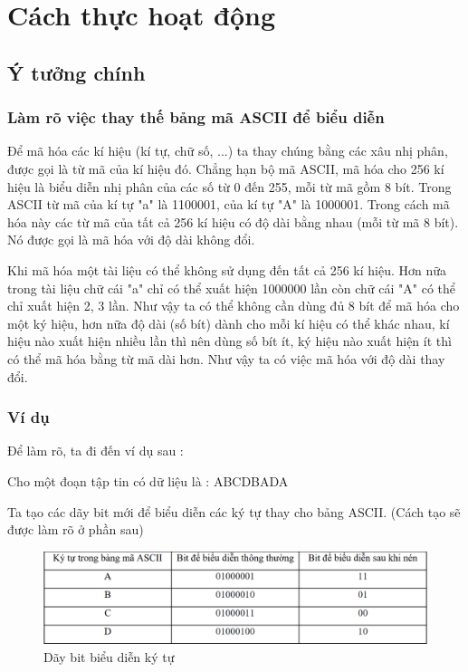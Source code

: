 \documentclass[14pt]{extreport}
\begin{document}
\chapter{Cách thực hoạt động}
\section{Ý tưởng chính}

\subsection{Làm rõ việc thay thế bảng mã ASCII để biểu diễn}
Để mã hóa các kí hiệu (kí tự, chữ số, ...) ta thay chúng bằng các xâu nhị phân, được gọi là từ mã của kí hiệu đó. Chẳng hạn bộ mã ASCII, mã hóa cho 256 kí hiệu là biểu diễn nhị phân của các số từ 0 đến 255, mỗi từ mã gồm 8 bít. Trong ASCII từ mã của kí tự "a" là 1100001, của kí tự "A" là 1000001. Trong cách mã hóa này các từ mã của tất cả 256 kí hiệu có độ dài bằng nhau (mỗi từ mã 8 bít). Nó được gọi là mã hóa với độ dài không đổi. 

 Khi mã hóa một tài liệu có thể không sử dụng đến tất cả 256 kí hiệu. Hơn nữa trong tài liệu chữ cái "a" chỉ có thể xuất hiện 1000000 lần còn chữ cái "A" có thể chỉ xuất hiện 2, 3 lần. Như vậy ta có thể không cần dùng đủ 8 bít để mã hóa cho một ký hiệu, hơn nữa độ dài (số bít) dành cho mỗi kí hiệu có thể khác nhau, kí hiệu nào xuất hiện nhiều lần thì nên dùng số bít ít, ký hiệu nào xuất hiện ít thì có thể mã hóa bằng từ mã dài hơn. Như vậy ta có việc mã hóa với độ dài thay đổi.
 
 \subsection{Ví dụ}
\cite{1}Để làm rõ, ta đi đến ví dụ sau : 

Cho một đoạn tập tin có dữ liệu là : ABCDBADA

Ta tạo các dãy bit mới để biểu diễn các ký tự thay cho bảng ASCII. (Cách tạo sẽ được làm rõ ở phần sau)

\begin{center}
    \begin{figure}[H]
    \begin{center}
     \includegraphics[scale=.65]{zip_table.PNG}
    \end{center}
    \caption{Dãy bit biểu diễn ký tự}
    \label{refhinh1}
    \end{figure}
\end{center}
\end{document}
